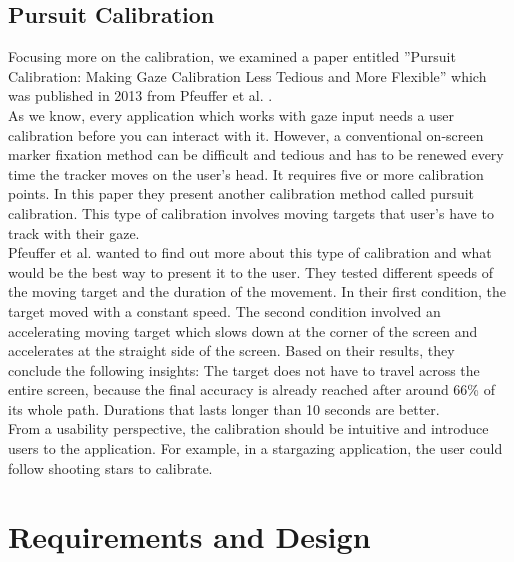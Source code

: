 \documentclass{sigchi}
\begin{document}
\subsection{Pursuit Calibration}
Focusing more on the calibration, we examined a paper entitled ''Pursuit Calibration: Making Gaze Calibration Less Tedious and More Flexible'' which was published in 2013 from Pfeuffer et al.  \cite{pfeuffer2013pursuit}.\\
As we know, every application which works with gaze input needs a user calibration before you can interact with it. However, a conventional on-screen marker fixation method can be difficult and tedious and has to be renewed every time the tracker moves on the user's head. It requires five or more calibration points. In this paper they present another calibration method called pursuit calibration. This type of calibration involves moving targets that user's have to track with their gaze.\\
Pfeuffer et al. wanted to find out more about this type of calibration and what would be the best way to present it to the user. They tested different speeds of the moving target and the duration of the movement. In their first condition, the target moved with a constant speed. The second condition involved an accelerating moving target which slows down at the corner of the screen and accelerates at the straight side of the screen. Based on their results, they conclude the following insights: The target does not have to travel across the entire screen, because the final accuracy is already reached after around 66\% of its whole path. Durations that lasts longer than 10 seconds are better.\\
From a usability perspective, the calibration should be intuitive and introduce users to the application. For example, in a stargazing application, the user could follow shooting stars to calibrate.

\section{Requirements and Design}
\end{document}
